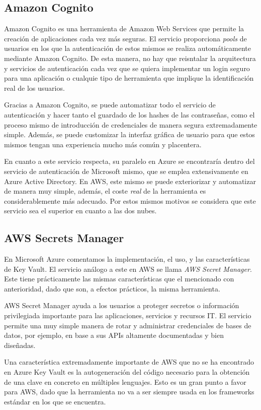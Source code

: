 \documentclass[english,runningheads,a4paper]{llncs}[2018/03/10]
\begin{document}
\subsection*{Amazon Cognito}
Amazon Cognito es una herramienta de Amazon Web Services que permite la creación
de aplicaciones cada vez más seguras. El servicio proporciona \textit{pools} de
usuarios en los que la autenticación de estos mismos se realiza automáticamente
mediante Amazon Cognito. De esta manera, no hay que reisntalar la arquitectura y
servicios de autenticación cada vez que se quiera implementar un login seguro
para una aplicación o cualquie tipo de herramienta que implique la
identificación real de los usuarios. 

Gracias a Amazon Cognito, se puede automatizar todo el servicio de
autenticación y hacer tanto el guardado de los hashes de las contraseñas, como
el proceso mismo de introducción de credenciales de manera segura extremadamente
simple. Además, se puede customizar la interfaz gráfica de usuario para que
estos mismos tengan una experiencia mucho más común y placentera. 

En cuanto a este servicio respecta, su paralelo en Azure se encontraría dentro
del servicio de autenticación de Microsoft mismo, que se emplea extensivamente
en Azure Active Directory. En AWS, este mismo se puede exteriorizar y
automatizar de manera muy simple, además, el coste \textit{real} de la
herramienta es considerablemente más adecuado. Por estos mismos motivos se
considera que este servicio sea el superior en cuanto a las dos nubes.

\subsection*{AWS Secrets Manager}
En Microsoft Azure comentamos la implementación, el uso, y las características
de Key Vault. El servicio análogo a este en AWS se llama \textit{AWS Secret
Manager}. Este tiene prácticamente las mismas características que el mencionado
con anterioridad, dado que son, a efectos prácticos, la misma herramienta. 

AWS Secret Manager ayuda a los usuarios a proteger secretos o información
privilegiada importante para las aplicaciones, servicios y recursos IT. El
servicio permite una muy simple manera de rotar y administrar credenciales de
bases de datos, por ejemplo, en base a sus APIs altamente documentadas y bien
diseñadas.

Una característica extremadamente importante de AWS que no se ha encontrado en
Azure Key Vault es la autogeneración del código necesario para la obtención de
una clave en concreto en múltiples lenguajes. Esto es un gran punto a favor para
AWS, dado que la herramienta no va a ser siempre usada en los frameworks
estándar en los que se encuentra.
\end{document}
